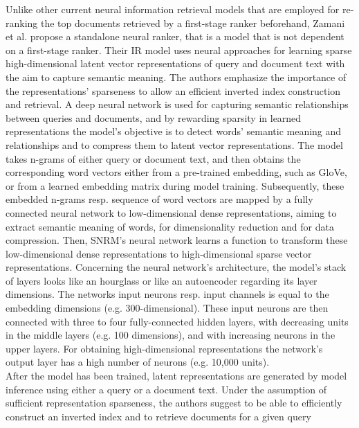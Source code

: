 Unlike other current neural information retrieval models that 
    are employed for re-ranking the top documents retrieved by 
    a first-stage ranker beforehand,
    Zamani et al. \cite{zamani:2018:from-neural-reranking-to-neural-ranking} 
    propose a standalone neural ranker, that is
    a model that is not dependent on a first-stage ranker.
Their IR model uses neural approaches for learning sparse high-dimensional
    latent vector representations of query and document text 
    with the aim to capture semantic meaning.
The authors emphasize the importance of the representations' sparseness
    to allow an efficient inverted index construction and retrieval.
A deep neural network is used for capturing semantic relationships between
    queries and documents, and by rewarding sparsity in learned representations
    the model's objective is to detect words' semantic meaning and 
    relationships and to compress them to latent vector representations.
The model takes n-grams of either query or document text,
    and then obtains the corresponding word vectors 
    either from a pre-trained embedding, such as GloVe, or 
    from a learned embedding matrix during model training. 
Subsequently, these embedded n-grams resp. sequence of word vectors 
    are mapped by a fully connected neural network 
    to low-dimensional dense representations,
    aiming to extract semantic meaning of words, 
    for dimensionality reduction and for data compression.
Then, SNRM's neural network learns a function to transform 
    these low-dimensional dense representations to 
    high-dimensional sparse vector representations.
Concerning the neural network's architecture, the model's 
    stack of layers looks like an hourglass or like an autoencoder
    regarding its layer dimensions.
The networks input neurons resp. input channels is equal to the
    embedding dimensions (e.g. 300-dimensional).
These input neurons are then connected with three to four 
    fully-connected hidden layers, with decreasing units in the middle 
    layers (e.g. 100 dimensions), and with increasing neurons in 
    the upper layers.
For obtaining high-dimensional representations the network's output 
    layer has a high number of neurons (e.g. 10,000 units).\\
After the model has been trained, latent representations are generated
    by model inference using either a query or a document text.
Under the assumption of sufficient representation sparseness, 
    the authors suggest to be able to efficiently construct an 
    inverted index and to retrieve documents for a given query 
